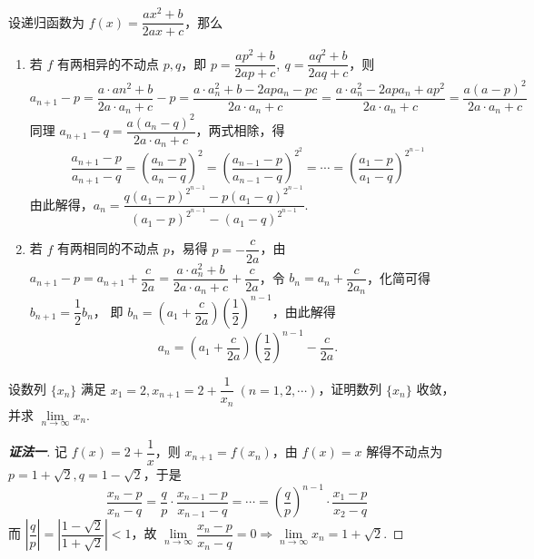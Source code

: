 \begin{solution}
    设递归函数为 $f(x)=\dfrac{ax^2+b}{2ax+c}$，那么
    \begin{enumerate}
        \item 若 $f$ 有两相异的不动点 $p,q$，即 $p=\dfrac{ap^2+b}{2ap+c},~q=\dfrac{aq^2+b}{2aq+c}$，则
              $$a_{n+1}-p=\dfrac{a\cdot an^{2}+b}{2a\cdot a_{n}+c}-p=\dfrac{a\cdot a_{n}^{2}+b-2apa_{n}-pc}{2a\cdot a_{n}+c}=\dfrac{a\cdot a_{n}^{2}-2apa_{n}+ap^{2}}{2a\cdot a_{n}+c}=\dfrac{a(a-p)^2}{2a\cdot a_n+c}$$
              同理 $a_{n+1}-q=\dfrac{a\left( a_{n}-q\right) ^{2}}{2a\cdot a_{n}+c}$，两式相除，得
              $$\dfrac{a_{n+1}-p}{a_{n+1}-q}=\left(\dfrac{a_n-p}{a_n-q}\right)^2=\left(\dfrac{a_{n-1}-p}{a_{n-1}-q}\right)^{2^2}=\cdots=\left(\dfrac{a_1-p}{a_1-q}\right)^{2^{n-1}}$$
              由此解得，$a_{n}=\dfrac{q\left( a_{1}-p\right) ^{2^{n-1}}-p\left( a_1-q\right)^ {2^{n-1}}}{\left( a_{1}-p\right) ^{2^{n-1}}-\left( a_{1}-q\right) ^{2^{n-1}}}.$
        \item 若 $f$ 有两相同的不动点 $p$，易得 $p=-\dfrac{c}{2a}$，由 $a_{n+1}-p=a_{n+1}+\dfrac{c}{2a}=\dfrac{a\cdot a_n^2+b}{2a\cdot a_n+c}+\dfrac{c}{2a}$，令 $b_n=a_n+\dfrac{c}{2a_n}$，化简可得 $b_{n+1}=\dfrac{1}{2}b_n$，
              即 $b_n=\left(a_1+\dfrac{c}{2a}\right)\left(\dfrac{1}{2}\right)^{n-1}$，由此解得
              $$a_{n}=\left( a_{1}+\dfrac{c}{2a}\right) \left( \dfrac{1}{2}\right) ^{n-1}-\dfrac{c}{2a}.$$
    \end{enumerate}
\end{solution}
\begin{example}
    设数列 $\{x_n\}$ 满足 $x_1=2,x_{n+1}=2+\dfrac{1}{x_n}~  (n=1,2,\cdots)$，证明数列 $\{x_n\}$ 收敛，并求 $\lim\limits_{n\to\infty}x_n.$
\end{example}
\begin{proof}[{\songti \textbf{证法一}}]
    记 $f(x)=2+\dfrac{1}{x}$，则 $x_{n+1}=f(x_n)$，由 $f(x)=x$ 解得不动点为 $p=1+\sqrt{2},q=1-\sqrt{2}$，于是
    $$\dfrac{x_{n}-p}{x_{n}-q}=\dfrac{q}{p}\cdot \dfrac{x_{n-1}-p}{x_{n-1}-q}=\cdots=\left( \dfrac{q}{p}\right) ^{n-1}\cdot \dfrac{x_{1}-p}{x_{2}-q}$$
    而 $\left| \dfrac{q}{p}\right| =\left| \dfrac{1-\sqrt{2}}{1+\sqrt{2}}\right|  <1$，故 $\lim\limits_{n\to\infty}\dfrac{x_n-p}{x_n-q}=0\Rightarrow \lim\limits_{n\to\infty}x_n=1+\sqrt{2}.$
\end{proof}
